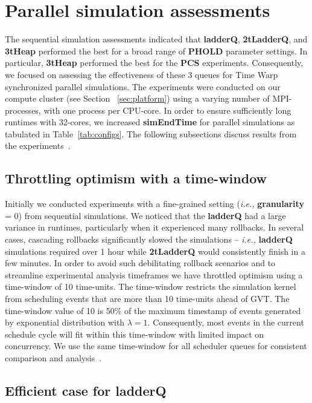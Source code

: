 \section{Parallel simulation assessments}\label{sec:par}

The sequential simulation assessments indicated that \textbf{ladderQ}, \textbf{2tLadderQ}, and \textbf{3tHeap} performed the best for a broad range of \textbf{PHOLD} parameter settings. In particular, \textbf{3tHeap} performed the best for the \textbf{PCS} experiments. Consequently, we focused on assessing the effectiveness of these 3 queues for Time Warp synchronized parallel simulations. The experiments were conducted on our compute cluster (see Section ~\ref{sec:platform}) using a varying number of MPI-processes, with one process per CPU-core. In order to ensure sufficiently long runtimes with 32-cores, we increased \textbf{simEndTime} for parallel simulations as tabulated in Table~\ref{tab:configs}. The following subsections discuss results from the experiments~\cite{higiro2017multi}.

\subsection{Throttling optimism with a time-window}

Initially we conducted experiments with a fine-grained setting (\textit{i.e.,} \textbf{granularity} = 0) from sequential simulations. We noticed that the \textbf{ladderQ} had a large variance in runtimes, particularly when it experienced many rollbacks. In several cases, cascading rollbacks significantly slowed the simulations -- \textit{i.e.,} \textbf{ladderQ} simulations required over 1 hour while \textbf{2tLadderQ} would consistently finish in a few minutes. In order to avoid such debilitating rollback scenarios and to streamline experimental analysis timeframes we have throttled optimism using a time-window of 10 time-units. The time-window restricts the simulation kernel from scheduling events that are more than 10 time-units ahead of GVT. The time-window value of 10 is 50\% of the maximum timestamp of events generated by exponential distribution with $\lambda=1$. Consequently, most events in the current schedule cycle will fit within this time-window with limited impact on concurrency. We use the same time-window for all scheduler queues for consistent comparison and analysis~\cite{higiro2017multi}.

\subsection{Efficient case for ladderQ}

